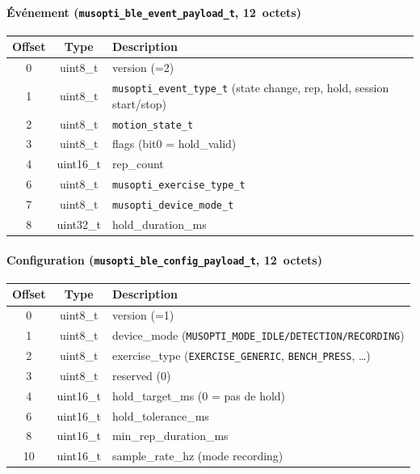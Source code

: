 \documentclass[a4paper,11pt]{article}
\begin{document}
\paragraph{Événement (\texttt{musopti\_ble\_event\_payload\_t}, 12~octets)}
\begin{center}
\begin{tabular}{@{}ccl@{}}
\toprule
Offset & Type & Description \\
\midrule
0 & uint8\_t & version (=2) \\
1 & uint8\_t & \texttt{musopti\_event\_type\_t} (state change, rep, hold, session start/stop) \\
2 & uint8\_t & \texttt{motion\_state\_t} \\
3 & uint8\_t & flags (bit0 = hold\_valid) \\
4 & uint16\_t & rep\_count \\
6 & uint8\_t & \texttt{musopti\_exercise\_type\_t} \\
7 & uint8\_t & \texttt{musopti\_device\_mode\_t} \\
8 & uint32\_t & hold\_duration\_ms \\
\bottomrule
\end{tabular}
\end{center}

\paragraph{Configuration (\texttt{musopti\_ble\_config\_payload\_t}, 12~octets)}
\begin{center}
\begin{tabular}{@{}ccl@{}}
\toprule
Offset & Type & Description \\
\midrule
0 & uint8\_t & version (=1) \\
1 & uint8\_t & device\_mode (\texttt{MUSOPTI\_MODE\_IDLE/DETECTION/RECORDING}) \\
2 & uint8\_t & exercise\_type (\texttt{EXERCISE\_GENERIC}, \texttt{BENCH\_PRESS}, \dots) \\
3 & uint8\_t & reserved (0) \\
4 & uint16\_t & hold\_target\_ms (0 = pas de hold) \\
6 & uint16\_t & hold\_tolerance\_ms \\
8 & uint16\_t & min\_rep\_duration\_ms \\
10 & uint16\_t & sample\_rate\_hz (mode recording) \\
\bottomrule
\end{tabular}
\end{center}
\end{document}

